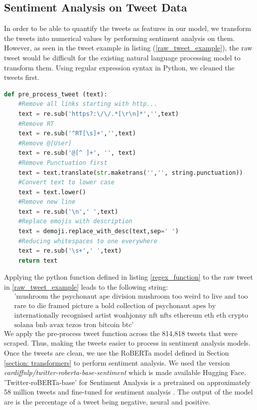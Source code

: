 \subsection*{Sentiment Analysis on Tweet Data}
In order to be able to quantify the tweets as features in our model, we transform the tweets into numerical values by performing sentiment analysis on them. However, as seen in the tweet example in listing (\ref{raw_tweet_example}), the raw tweet would be difficult for the existing natural language processing model to transform them. Using regular expression syntax in Python, we cleaned the tweets first.
\begin{lstlisting}[language=Python, caption= {Python function to clean Tweets using RegEx (regular expression)}, label= regex_function]
    def pre_process_tweet (text):
    #Remove all links starting with http...
    text = re.sub('https?:\/\/.*[\r\n]*','',text)
    #Remove RT
    text = re.sub('^RT[\s]+','',text)
    #Remove @[User]
    text = re.sub('@[^ ]+', '', text)
    #Remove Punctuation first
    text = text.translate(str.maketrans('','', string.punctuation))
    #Convert text to lower case
    text = text.lower()
    #Remove new line
    text = re.sub('\n',' ',text)
    #Replace emojis with description
    text = demoji.replace_with_desc(text,sep=' ')
    #Reducing whitespaces to one everywhere
    text = re.sub('\s+',' ',text)
    return text
\end{lstlisting}
Applying the python function defined in listing \ref{regex_function} to the raw tweet in \ref{raw_tweet_example} leads to the following string:
\begin{align}
    \label{preprocess_tweet}
    \nonumber
    &\text{'mushroom the psychonaut ape division mushroom too weird to live and too } \\
    \nonumber
    &\text{rare to die framed picture a bold collection of psychonaut apes by  }\\
    \nonumber
    &\text{internationally recognised artist woahjonny nft nfts ethereum eth eth crypto }\\
    &\text{solana bnb avax tezos tron bitcoin btc'}
\end{align}
We apply the pre-process tweet function across the 814,818 tweets that were scraped. Thus, making the tweets easier to process in sentiment analysis models. Once the tweets are clean, we use the RoBERTa model defined in Section \ref{section: transformers} to perform sentiment analysis. We used the version \textit{cardiffnlp/twitter-roberta-base-sentiment} which is made available Hugging Face. 'Twitter-roBERTa-base' for Sentiment Analysis is a pretrained  on approximately 58 million tweets and fine-tuned for sentiment analysis \cite{France2020}. The output of the model are is the percentage of a tweet being negative, neural and positive.
